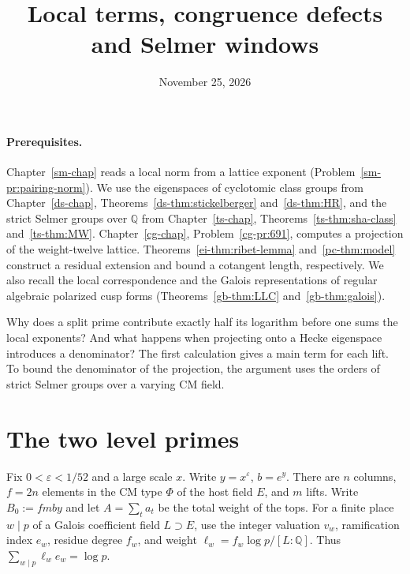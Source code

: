 \documentclass[reqno]{amsart}
\title{Local terms, congruence defects and Selmer windows}
\author{}
\date{November 25, 2026}
\newcounter{chap}
\theoremstyle{definition}
\theoremstyle{plain}
\newcommand{\Q}{\mathbb Q}
\begin{document}
\maketitle
{}\label{chap}

\paragraph{Prerequisites.}
Chapter~\ref{sm-chap} reads a local norm from a lattice exponent (Problem~\ref{sm-pr:pairing-norm}).
We use the eigenspaces of cyclotomic class groups from Chapter~\ref{ds-chap}, Theorems~\ref{ds-thm:stickelberger} and~\ref{ds-thm:HR}, and the strict Selmer groups over \(\Q\) from Chapter~\ref{ts-chap}, Theorems~\ref{ts-thm:sha-class} and~\ref{ts-thm:MW}.  Chapter~\ref{cg-chap}, Problem~\ref{cg-pr:691}, computes a projection of the weight-twelve lattice.  Theorems~\ref{ei-thm:ribet-lemma} and~\ref{pc-thm:model} construct a residual extension and bound a cotangent length, respectively.  We also recall the local correspondence and the Galois representations of regular algebraic polarized cusp forms (Theorems~\ref{gb-thm:LLC} and~\ref{gb-thm:galois}).

Why does a split prime contribute exactly half its logarithm before one sums the local exponents? And what happens when projecting onto a Hecke eigenspace introduces a denominator? The first calculation gives a main term for each lift.  To bound the denominator of the projection, the argument uses the orders of strict Selmer groups over a varying CM field.

\section{The two level primes}\label{sec:local}
Fix \(0<\varepsilon<1/52\) and a large scale \(x\).  Write \(y=x^\varepsilon\), \(b=e^y\).
There are \(n\) columns, \(f=2n\) elements in the CM type \(\Phi\) of the host field \(E\), and \(m\) lifts.  Write \(B_0:=fmby\) and let \(A=\sum_t a_t\) be the total weight of the tops.  For a finite place \(w\mid p\) of a Galois coefficient field \(L\supset E\), use the integer valuation \(v_w\), ramification index \(e_w\), residue degree \(f_w\), and weight \(\ell_w=f_w\log p/[L:\Q]\).  Thus \(\sum_{w\mid p}\ell_we_w=\log p\).
\end{document}
